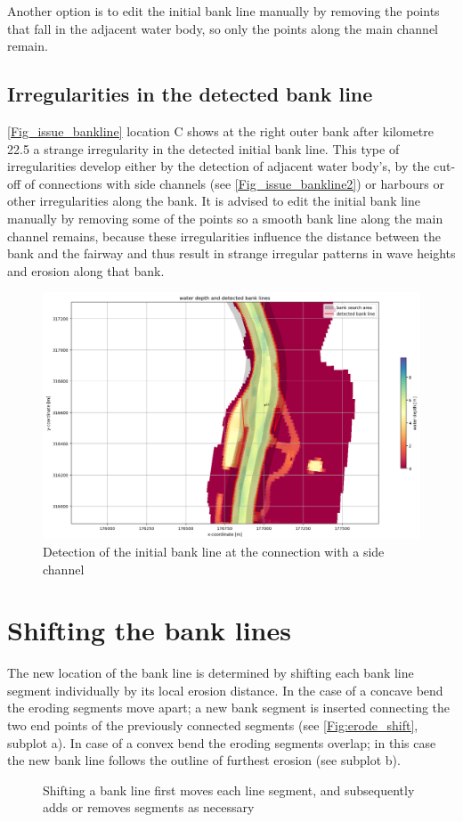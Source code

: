 Another option is to edit the initial bank line manually by removing the points that fall in the adjacent water body, so only the points along the main channel remain.

\subsection{Irregularities in the detected bank line}
\autoref{Fig_issue_bankline} location C shows at the right outer bank after kilometre 22.5 a strange irregularity in the detected initial bank line.
This type of irregularities develop either by the detection of adjacent water body's, by the cut-off of connections with side channels (see \autoref{Fig_issue_bankline2}) or harbours or other irregularities along the bank.
It is advised to edit the initial bank line manually by removing some of the points so a smooth bank line along the main channel remains, because these irregularities influence the distance between the bank and the fairway and thus result in strange irregular patterns in wave heights and erosion along that bank.

\begin{figure}[!h]
	\includegraphics[width=\textwidth]{figures/detection_issue2.png}
	\caption{Detection of the initial bank line at the connection with a side channel}
	\label{Fig_issue_bankline2}
\end{figure}

\section{Shifting the bank lines} \label{Sec:BankShift}

The new location of the bank line is determined by shifting each bank line segment individually by its local erosion distance.
In the case of a concave bend the eroding segments move apart; a new bank segment is inserted connecting the two end points of the previously connected segments (see \autoref{Fig:erode_shift}, subplot a).
In case of a convex bend the eroding segments overlap; in this case the new bank line follows the outline of furthest erosion (see subplot b).

\begin{figure}[!h]
\center
\resizebox{12cm}{!}{
   
}
\caption{Shifting a bank line first moves each line segment, and subsequently adds or removes segments as necessary}
\label{Fig:erode_shift}
\end{figure}

